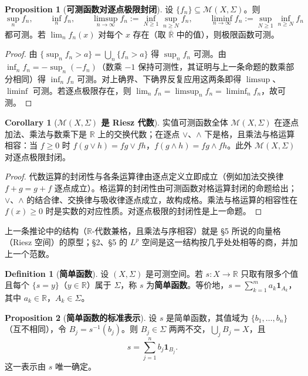 \documentclass[oneside]{book}
\theoremstyle{definition}
\newcommand{\R}{\mathbb{R}}
\theoremstyle{definition}
\newtheorem{proposition}{Proposition}[section]
\newtheorem{definition}{Definition}[section]
\newtheorem{corollary}{Corollary}[section]
\begin{document}
	\begin{proposition}[\bfseries{可测函数对逐点极限封闭}]
		设 $\{f_n\}\subseteq\mathcal{M}(X,\Sigma)$。则
		\[
		\sup_n f_n,\qquad \inf_n f_n,\qquad \limsup_{n\to\infty}f_n:=\inf_{N\geqslant1}\sup_{n\geqslant N}f_n,\qquad \liminf_{n\to\infty}f_n:=\sup_{N\geqslant1}\inf_{n\geqslant N}f_n
		\]
		都可测。若 $\lim_n f_n(x)$ 对每个 $x$ 存在（取 $\overline{\R}$ 中的值），则极限函数可测。
	\end{proposition}
	
	\begin{proof}
		由 $\{\sup_n f_n>a\}=\bigcup_n\{f_n>a\}$ 得 $\sup_n f_n$ 可测。由 $\inf_n f_n=-\sup_n(-f_n)$（数乘 $-1$ 保持可测性，其证明与上一条命题的数乘部分相同）得 $\inf_n f_n$ 可测。对上确界、下确界反复应用这两条即得 $\limsup$、$\liminf$ 可测。若逐点极限存在，则 $\lim_n f_n=\limsup_n f_n=\liminf_n f_n$，故可测。
	\end{proof}
	
	\begin{corollary}[\bfseries{$\mathcal{M}(X,\Sigma)$ 是 Riesz 代数}]
		实值可测函数全体 $\mathcal{M}(X,\Sigma)$ 在逐点加法、乘法与数乘下是 $\R$ 上的交换代数；在逐点 $\vee$、$\wedge$ 下是格，且乘法与格运算相容：当 $f\geqslant0$ 时 $f(g\vee h)=fg\vee fh$，$f(g\wedge h)=fg\wedge fh$。此外 $\mathcal{M}(X,\Sigma)$ 对逐点极限封闭。
	\end{corollary}
	
	\begin{proof}
		代数运算的封闭性与各条运算律由逐点定义立即成立（例如加法交换律 $f+g=g+f$ 逐点成立）。格运算的封闭性由可测函数对格运算封闭的命题给出；$\vee$、$\wedge$ 的结合律、交换律与吸收律逐点成立，故构成格。乘法与格运算的相容性在 $f(x)\geqslant0$ 时是实数的对应性质。对逐点极限的封闭性是上一命题。
	\end{proof}
	
	上一条推论中的结构（$\R$-代数兼格，且乘法与序相容）就是 \S5 所说的向量格（Riesz 空间）的原型；\S2、\S5 的 $L^{p}$ 空间是这一结构按几乎处处相等的商，并加上一个范数。
	
	\begin{definition}[\bfseries{简单函数}]
		设 $(X,\Sigma)$ 是可测空间。若 $s:X\to\R$ 只取有限多个值且每个 $\{s=y\}$（$y\in\R$）属于 $\Sigma$，称 $s$ 为\textbf{简单函数}。等价地，$s=\sum_{k=1}^{m}a_k\mathbf{1}_{A_k}$，其中 $a_k\in\R$，$A_k\in\Sigma$。
	\end{definition}
	
	\begin{proposition}[\bfseries{简单函数的标准表示}]
		设 $s$ 是简单函数，其值域为 $\{b_1,\dots,b_n\}$（互不相同），令 $B_j=s^{-1}(b_j)$。则 $B_j\in\Sigma$ 两两不交，$\bigcup_j B_j=X$，且
		\[
		s=\sum_{j=1}^{n}b_j\mathbf{1}_{B_j}.
		\]
		这一表示由 $s$ 唯一确定。
	\end{proposition}
	
\end{document}
